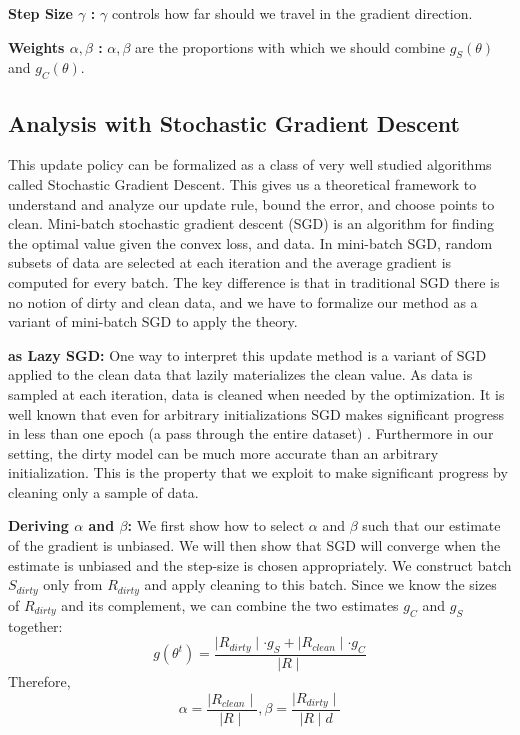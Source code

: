 \noindent\textbf{Step Size $\gamma$ : } $\gamma$ controls how far should we travel in the gradient direction.

\vspace{0.25em}

\noindent\textbf{Weights $\alpha,\beta$ : } $\alpha,\beta$ are the proportions with which we should combine $g_S(\theta)$ and $g_C(\theta)$. 

\subsection{Analysis with Stochastic Gradient Descent}\label{sgd}
This update policy can be formalized as a class of very well studied algorithms called Stochastic Gradient Descent.
This gives us a theoretical framework to understand and analyze our update rule, bound the error, and choose points to clean.
Mini-batch stochastic gradient descent (SGD) is an algorithm for finding the optimal value
given the convex loss, and data.
In mini-batch SGD, random subsets of data are selected at each iteration and the average gradient is computed for every batch.
The key difference is that in traditional SGD there is no notion of dirty and clean data, and we have to formalize our method as a variant of mini-batch SGD to apply the theory.

\vspace{0.25em}

\noindent\textbf{ \sys as Lazy SGD: } One way to interpret this update method is a variant of SGD applied to the clean data that lazily materializes the clean value.
As data is sampled at each iteration, data is cleaned when needed by the optimization.
It is well known that even for arbitrary initializations SGD makes significant progress in less than one epoch (a pass through the entire dataset) \cite{bottou2012stochastic}.
Furthermore in our setting, the dirty model can be much more accurate than an arbitrary initialization.
This is the property that we exploit to make significant progress by cleaning only a sample of data.

\vspace{0.25em}

\noindent\textbf{Deriving $\alpha$ and $\beta$: } We first show how to select $\alpha$ and $\beta$ such that our estimate of the gradient is unbiased. 
We will then show that SGD will converge when the estimate is unbiased and the step-size is chosen appropriately.
We construct batch $S_{dirty}$ only from $R_{dirty}$ and apply cleaning to this batch.
Since we know the sizes of $R_{dirty}$ and its complement, we can combine the two estimates $g_C$ and $g_S$ together:
\[
g(\theta^{t}) = \frac{\mid R_{dirty} \mid \cdot g_S + \mid R_{clean} \mid \cdot g_C  }{\mid R \mid}
\]
Therefore,
\[
\alpha = \frac{\mid R_{clean} \mid}{\mid R \mid}, \beta = \frac{\mid R_{dirty} \mid}{\mid R \mid d}
\]

